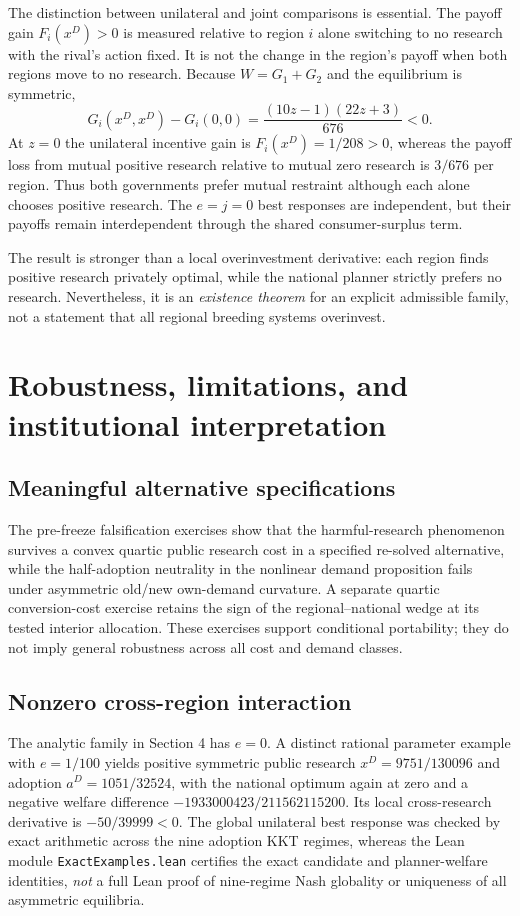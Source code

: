 \documentclass[11pt]{article}
\begin{document}
The distinction between unilateral and joint comparisons is essential. The payoff gain $F_i(x^D)>0$ is measured relative to region $i$ alone switching to no research with the rival's action fixed. It is not the change in the region's payoff when both regions move to no research. Because $W=G_1+G_2$ and the equilibrium is symmetric,
\begin{equation}
G_i(x^D,x^D)-G_i(0,0)=\frac{(10z-1)(22z+3)}{676}<0.
\label{eq:mutuallocal}
\end{equation}
At $z=0$ the unilateral incentive gain is $F_i(x^D)=1/208>0$, whereas the payoff loss from mutual positive research relative to mutual zero research is $3/676$ per region. Thus both governments prefer mutual restraint although each alone chooses positive research. The $e=j=0$ best responses are independent, but their payoffs remain interdependent through the shared consumer-surplus term.

The result is stronger than a local overinvestment derivative: each region finds positive research privately optimal, while the national planner strictly prefers no research. Nevertheless, it is an \emph{existence theorem} for an explicit admissible family, not a statement that all regional breeding systems overinvest.

\section{Robustness, limitations, and institutional interpretation}
\subsection{Meaningful alternative specifications}
The pre-freeze falsification exercises show that the harmful-research phenomenon survives a convex quartic public research cost in a specified re-solved alternative, while the half-adoption neutrality in the nonlinear demand proposition fails under asymmetric old/new own-demand curvature. A separate quartic conversion-cost exercise retains the sign of the regional--national wedge at its tested interior allocation. These exercises support conditional portability; they do not imply general robustness across all cost and demand classes.

\subsection{Nonzero cross-region interaction}
The analytic family in Section 4 has $e=0$. A distinct rational parameter example with $e=1/100$ yields positive symmetric public research $x^D=9751/130096$ and adoption $a^D=1051/32524$, with the national optimum again at zero and a negative welfare difference $-1933000423/211562115200$. Its local cross-research derivative is $-50/39999<0$. The global unilateral best response was checked by exact arithmetic across the nine adoption KKT regimes, whereas the Lean module \texttt{ExactExamples.lean} certifies the exact candidate and planner-welfare identities, \emph{not} a full Lean proof of nine-regime Nash globality or uniqueness of all asymmetric equilibria.
\end{document}
